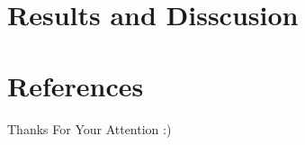 \documentclass{beamer}
\begin{document}
\section{Results and Disscusion}
\section{References}



\begin{frame}
\Huge{\centerline{Thanks For Your Attention :)}}
\end{frame}

\end{document}
